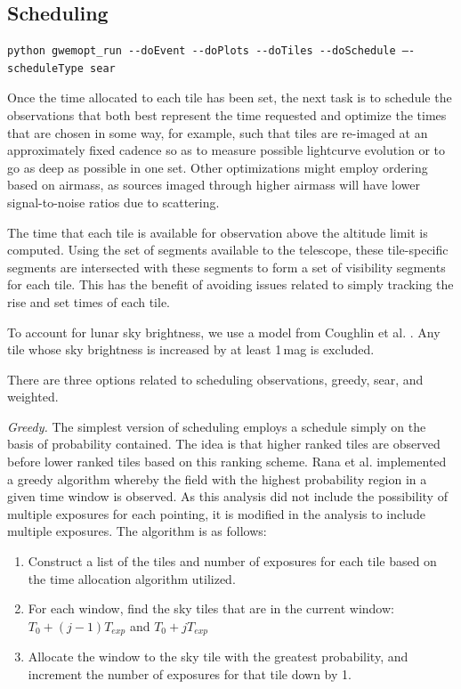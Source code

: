 \documentclass[twocolumn]{aastex61}
\begin{document}
\subsection{Scheduling}
\begin{lstlisting}
python gwemopt_run --doEvent --doPlots --doTiles --doSchedule —-scheduleType sear
\end{lstlisting}
Once the time allocated to each tile has been set, the next task is to schedule the observations that both best represent the time requested and optimize the times that are chosen in some way, for example, such that tiles are re-imaged at an approximately fixed cadence so as to measure possible lightcurve evolution or to go as deep as possible in one set.
Other optimizations might employ ordering based on airmass, as sources imaged through higher airmass will have lower signal-to-noise ratios due to scattering.

The time that each tile is available for observation above the altitude limit is computed.
Using the set of segments available to the telescope, these tile-specific segments  are intersected with these segments to form a set of visibility segments for each tile.
This has the benefit of avoiding issues related to simply tracking the rise and set times of each tile.

To account for lunar sky brightness, we use a model from Coughlin et al. \cite{CoSt2016b}. 
Any tile whose sky brightness is increased by at least 1\,mag is excluded.

There are three options related to scheduling observations, greedy, sear, and weighted.

\emph{Greedy.} The simplest version of scheduling employs a schedule simply on the basis of probability contained. The idea is that higher ranked tiles are observed before lower ranked tiles based on this ranking scheme. Rana et al. \cite{RaSi2017} implemented a greedy algorithm whereby the field with the highest probability region in a given time window is observed. As this analysis did not include the possibility of multiple exposures for each pointing, it is modified in the analysis to include multiple exposures. The algorithm is as follows:

\begin{enumerate}
\item Construct a list of the tiles and number of exposures for each tile based on the time allocation algorithm utilized.
\item For each window, find the sky tiles that are in the current window: $T_0 + (j-1) T_{exp}$ and $T_0 + j T_{exp}$
\item Allocate the window to the sky tile with the greatest probability, and increment the number of exposures for that tile down by 1.
\end{enumerate}
\end{document}
